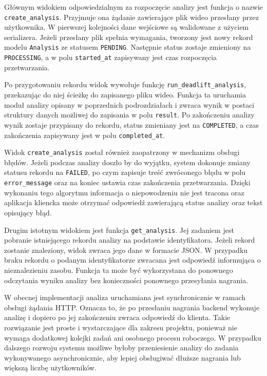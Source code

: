Głównym widokiem odpowiedzialnym za rozpoczęcie analizy jest funkcja o nazwie \texttt{create\_analysis}. Przyjmuje ona żądanie zawierające plik wideo przesłany przez użytkownika. W pierwszej kolejności dane wejściowe są walidowane z użyciem serializera. Jeżeli przesłany plik spełnia wymagania, tworzony jest nowy rekord modelu \texttt{Analysis} ze statusem \texttt{PENDING}. Następnie status zostaje zmieniony na \texttt{PROCESSING}, a w polu \texttt{started\_at} zapisywany jest czas rozpoczęcia przetwarzania.

Po przygotowaniu rekordu widok wywołuje funkcję \texttt{run\_deadlift\_analysis}, przekazując do niej ścieżkę do zapisanego pliku wideo. Funkcja ta uruchamia moduł analizy opisany w poprzednich podrozdziałach i zwraca wynik w postaci struktury danych możliwej do zapisania w polu \texttt{result}. Po zakończeniu analizy wynik zostaje przypisany do rekordu, status zmieniany jest na \texttt{COMPLETED}, a czas zakończenia zapisywany jest w polu \texttt{completed\_at}.

Widok \texttt{create\_analysis} został również zaopatrzony w mechanizm obsługi błędów. Jeżeli podczas analizy doszło by do wyjątku, system dokonuje zmiany statusu rekordu na \texttt{FAILED}, po czym zapisuje treść zwróconego błędu w polu \texttt{error\_message} oraz na koniec ustawia czas zakończenia przetwarzania. Dzięki wykonaniu tego algorytmu informacja o niepowodzeniu nie jest tracona oraz aplikacja kliencka może otrzymać odpowiedź zawierającą status analizy oraz tekst opisujący błąd.

Drugim istotnym widokiem jest funkcja \texttt{get\_analysis}. Jej zadaniem jest pobranie istniejącego rekordu analizy na podstawie identyfikatora. Jeżeli rekord zostanie znaleziony, widok zwraca jego dane w formacie JSON. W przypadku braku rekordu o podanym identyfikatorze zwracana jest odpowiedź informująca o nieznalezieniu zasobu. Funkcja ta może być wykorzystana do ponownego odczytania wyniku analizy bez konieczności ponownego przesyłania nagrania.

W obecnej implementacji analiza uruchamiana jest synchronicznie w ramach obsługi żądania HTTP. Oznacza to, że po przesłaniu nagrania backend wykonuje analizę i dopiero po jej zakończeniu zwraca odpowiedź do klienta. Takie rozwiązanie jest proste i wystarczające dla zakresu projektu, ponieważ nie wymaga dodatkowej kolejki zadań ani osobnego procesu roboczego. W przypadku dalszego rozwoju systemu możliwe byłoby przeniesienie analizy do zadania wykonywanego asynchronicznie, aby lepiej obsługiwać dłuższe nagrania lub większą liczbę użytkowników.

